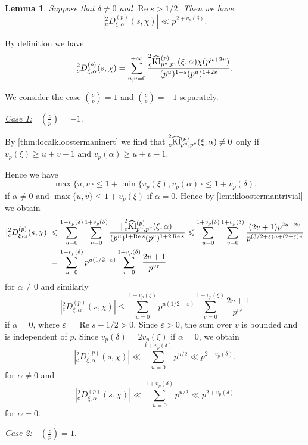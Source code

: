 \documentclass[10pt,oneside,reqno]{amsart}
\makeatletter
\renewcommand\Re{\mathop{\mathrm{Re}}}
\newcommand\Kl{\mathrm{Kl}}
\renewcommand\leq{\leqslant}
\renewcommand\geq{\geqslant}
\newcommand\legendresymbol[2]{\genfrac{(}{)}{}{}{#1}{#2}}
\theoremstyle{THEOREM}
\newtheorem{lemma}[theorem]{Lemma}
\theoremstyle{DEFINITION}
\theoremstyle{EXERCISE}
\numberwithin{equation}{section}
\renewenvironment{proof}[1][\proofname]{\par
  \vspace{-6pt}
  \pushQED{\qed}
  \normalfont \topsep6\p@\@plus6\p@\relax
  \trivlist
  \item[\hskip\labelsep\rmfamily\bfseries
    #1\@addpunct{:}]\ignorespaces
}{
  \popQED\endtrivlist\@endpefalse
  \vspace{-6pt}
}
\makeatother
\begin{document}
\begin{lemma}\label{lem:kloostermanlocalestimate}
Suppose that $\delta\neq 0$ and $\Re s>1/2$. Then we have
\[
|{}_c^2D_{\xi,\alpha}^{(p)}(s,\chi)|\ll p^{2+v_p(\delta)}.
\]
\end{lemma}
\begin{proof}
By definition we have
\[
{}_c^2D_{\xi,\alpha}^{(p)}(s,\chi)=\sum_{u,v=0}^{+\infty} \frac{\prescript{2}{c}{\widehat{\Kl}}_{p^u,p^v}^{(p)}(\xi,\alpha)\chi(p^{u+2v})}{(p^u) ^{1+s}(p^u)^{1+2s}}.
\]

We consider the case $\legendresymbol{c}{p}=1$ and $\legendresymbol{c}{p}=-1$ separately.

\underline{\emph{Case 1:}}\ \  $\legendresymbol{c}{p}=-1$.

By \autoref{thm:localkloostermaninert} we find that $\prescript{2}{c}{\widehat{\Kl}}_{p^u,p^v}^{(p)}(\xi,\alpha)\neq 0$ only if $v_p(\xi)\geq u+v-1$ and $v_p(\alpha)\geq u+v-1$.

Hence we have 
\[
\max\{u,v\}\leq 1+\min\{v_p(\xi),v_p(\alpha)\}\leq 1+v_p(\delta).
\]
if $\alpha\neq 0$ and $\max\{u,v\}\leq 1+v_p(\xi)$ if $\alpha=0$.
Hence by \autoref{lem:kloostermantrivial} we obtain
\begin{align*}
|{}_c^2D_{\xi,\alpha}^{(p)}(s,\chi)|&\leq \sum_{u=0}^{1+v_p(\delta)} \sum_{v=0}^{1+v_p(\delta)}\frac{|\prescript{2}{c}{\widehat{\Kl}}_{p^u,p^v}^{(p)} (\xi,\alpha)|}{(p^u)^{1+\Re s}(p^v)^{1+2\Re s}}\leq \sum_{u=0}^{1+v_p(\delta)} \sum_{v=0}^{1+v_p(\delta)}\frac{(2v+1)p^{2u+2v}}{p^{(3/2+\varepsilon) u+(2+\varepsilon)v}}\\
&=\sum_{u=0}^{1+v_p(\delta)}p^{u(1/2-\varepsilon)} \sum_{v=0}^{1+v_p(\delta)}\frac{2v+1}{p^{v\varepsilon}}
\end{align*}
for $\alpha\neq 0$ and similarly
\[
|{}_c^2D_{\xi,\alpha}^{(p)}(s,\chi)|\leq \sum_{u=0}^{1+v_p(\xi)}p^{u(1/2-\varepsilon)} \sum_{v=0}^{1+v_p(\xi)}\frac{2v+1}{p^{v\varepsilon}}
\]
if $\alpha=0$,
where $\varepsilon=\Re s-1/2>0$. Since $\varepsilon>0$, the sum over $v$ is bounded and is independent of $p$. Since $v_p(\delta)=2v_p(\xi)$ if $\alpha=0$, we obtain
\[
|{}_c^2D_{\xi,\alpha}^{(p)}(s,\chi)|\ll \sum_{u=0}^{1+v_p(\delta)}p^{u/2}\ll p^{2+v_p(\delta)}. 
\]
for $\alpha\neq 0$ and
\[
|{}_c^2D_{\xi,\alpha}^{(p)}(s,\chi)|\ll \sum_{u=0}^{1+v_p(\delta)}p^{u/2}\ll p^{2+v_p(\delta)}
\]
for $\alpha=0$.

\underline{\emph{Case 2:}}\ \  $\legendresymbol{c}{p}=1$.


\end{proof}
\end{document}

